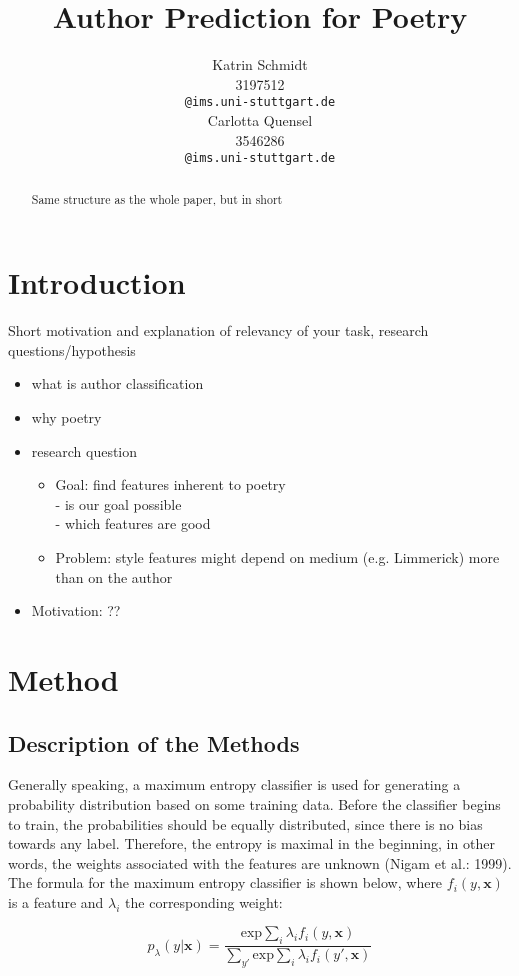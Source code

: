 \documentclass[11pt]{article}
\title{Author Prediction for Poetry}
\author{Katrin Schmidt \\
   3197512\\
  \texttt{@ims.uni-stuttgart.de} \\\And
  Carlotta Quensel \\
  3546286 \\
  \texttt{@ims.uni-stuttgart.de} \\}
\begin{document}
\maketitle
\begin{abstract}
Same structure as the whole paper, but in short
\end{abstract}

\section{Introduction}
Short motivation and explanation of relevancy
of your task, research questions/hypothesis
\begin{itemize}
\item what is author classification
\item why poetry
\item research question
\begin{itemize}
\item Goal: find features inherent to poetry\\- is our goal possible\\- which features are good
\item Problem: style features might depend on medium (e.g. Limmerick) more than on the author
\end{itemize}
\item Motivation: ??
\end{itemize}


\section{Method}
\subsection{Description of the Methods}
Generally speaking, a maximum entropy classifier is used for generating a probability distribution based on some training data. Before the classifier begins to train, the probabilities should be equally distributed, since there is no bias towards any label. Therefore, the entropy is maximal in the beginning, in other words, the weights associated with the features are unknown (Nigam et al.: 1999). The formula for the maximum entropy classifier is shown below, where $f_i(y, \pmb{x})$ is a feature and $\lambda_i$ the corresponding weight:

\[p_{\lambda}(y|\pmb{x}) = \frac{\text{exp} \sum_i \lambda_i f_i(y,\pmb{x})}{\sum_{y'} \text{exp} \sum_i \lambda_i f_i (y',\pmb{x})}\]
\end{document}
